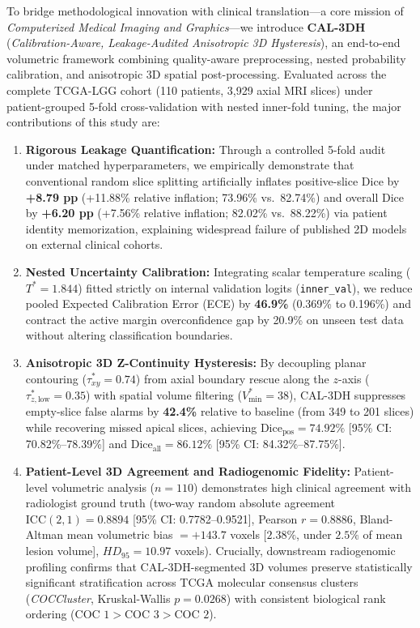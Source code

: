 \documentclass[11pt]{article}
\begin{document}
\vspace{0.6em}
To bridge methodological innovation with clinical translation---a core mission of \textit{Computerized Medical Imaging and Graphics}---we introduce \textbf{CAL-3DH} (\textit{Calibration-Aware, Leakage-Audited Anisotropic 3D Hysteresis}), an end-to-end volumetric framework combining quality-aware preprocessing, nested probability calibration, and anisotropic 3D spatial post-processing. Evaluated across the complete TCGA-LGG cohort (110 patients, 3,929 axial MRI slices) under patient-grouped 5-fold cross-validation with nested inner-fold tuning, the major contributions of this study are:
\begin{enumerate}
    \item \textbf{Rigorous Leakage Quantification:} Through a controlled 5-fold audit under matched hyperparameters, we empirically demonstrate that conventional random slice splitting artificially inflates positive-slice Dice by \textbf{+8.79 pp} (+11.88\% relative inflation; 73.96\% vs.\ 82.74\%) and overall Dice by \textbf{+6.20 pp} (+7.56\% relative inflation; 82.02\% vs.\ 88.22\%) via patient identity memorization, explaining widespread failure of published 2D models on external clinical cohorts.
    \item \textbf{Nested Uncertainty Calibration:} Integrating scalar temperature scaling ($T^* = 1.844$) fitted strictly on internal validation logits (\texttt{inner\_val}), we reduce pooled Expected Calibration Error (ECE) by \textbf{46.9\%} (0.369\% to 0.196\%) and contract the active margin overconfidence gap by 20.9\% on unseen test data without altering classification boundaries.
    \item \textbf{Anisotropic 3D Z-Continuity Hysteresis:} By decoupling planar contouring ($\tau_{xy}^* = 0.74$) from axial boundary rescue along the $z$-axis ($\tau_{z,\mathrm{low}}^* = 0.35$) with spatial volume filtering ($V_{\min}^* = 38$), CAL-3DH suppresses empty-slice false alarms by \textbf{42.4\%} relative to baseline (from 349 to 201 slices) while recovering missed apical slices, achieving $\text{Dice}_{\text{pos}} = \mathbf{74.92\%}$ [95\% CI: 70.82\%--78.39\%] and $\text{Dice}_{\text{all}} = \mathbf{86.12\%}$ [95\% CI: 84.32\%--87.75\%].
    \item \textbf{Patient-Level 3D Agreement and Radiogenomic Fidelity:} Patient-level volumetric analysis ($n=110$) demonstrates high clinical agreement with radiologist ground truth (two-way random absolute agreement $\text{ICC}(2, 1) = \mathbf{0.8894}$ [95\% CI: 0.7782--0.9521], Pearson $r = 0.8886$, Bland-Altman mean volumetric bias $= +143.7$ voxels [$2.38\%$, under $2.5\%$ of mean lesion volume], $HD_{95} = 10.97$ voxels). Crucially, downstream radiogenomic profiling confirms that CAL-3DH-segmented 3D volumes preserve statistically significant stratification across TCGA molecular consensus clusters (\textit{COCCluster}, Kruskal-Wallis $p = \mathbf{0.0268}$) with consistent biological rank ordering ($\text{COC 1} > \text{COC 3} > \text{COC 2}$).
\end{enumerate}
\end{document}
